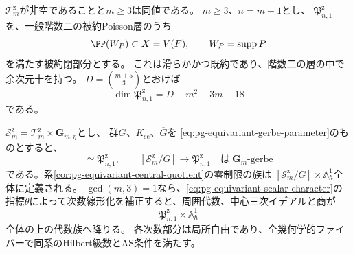 \begin{proposition}[support平面が超曲面に含まれる層の量子化]
\label{prop:pg-equivariant-zero-stratum}
$\mathcal T_m^{\mathrm z}$が非空であることと$m\ge3$は同値である。
$m\ge3$、$n=m+1$とし、
$\mathfrak P_{n,1}^{\mathrm z}$を、一般階数二の被約Poisson層のうち
\begin{equation}
 \PP(W_P)\subset X=V(F),\qquad W_P=\operatorname{supp}P
 \label{eq:pg-equivariant-contained-support-plane}
\end{equation}
を満たす被約閉部分とする。
これは滑らかかつ既約であり、階数二の層の中で余次元十を持つ。
$D=\binom{m+5}{3}$とおけば
\begin{equation}
 \dim\mathfrak P_{n,1}^{\mathrm z}=D-m^2-3m-18
 \label{eq:pg-equivariant-zero-stratum-dimension}
\end{equation}
である。

$\mathscr S_m^{\mathrm z}=\mathcal T_m^{\mathrm z}\times\mathbf G_{m,\eta}$とし、
群$G$、$K_{\mathrm{sc}}$、$\overline G$を
\eqref{eq:pg-equivariant-gerbe-parameter}のものとすると、
\begin{equation}
 [\mathscr S_m^{\mathrm z}/\overline G]\simeq\mathfrak P_{n,1}^{\mathrm z},
 \qquad
 [\mathscr S_m^{\mathrm z}/G]\longrightarrow\mathfrak P_{n,1}^{\mathrm z}
 \quad\text{は}\ \mathbf G_m\text{-gerbe}
 \label{eq:pg-equivariant-zero-gerbe}
\end{equation}
である。系\ref{cor:pg-equivariant-central-quotient}の零制限の族は
$[\mathscr S_m^{\mathrm z}/G]\times\mathbb A^1_\hbar$全体に定義される。
$\gcd(m,3)=1$なら、\eqref{eq:pg-equivariant-scalar-character}の
指標$\theta$によって次数線形化を補正すると、周囲代数、中心三次イデアルと商が
\begin{equation}
 \mathfrak P_{n,1}^{\mathrm z}\times\mathbb A^1_\hbar
 \label{eq:pg-equivariant-zero-descended-base}
\end{equation}
全体の上の代数族へ降りる。
各次数部分は局所自由であり、全幾何学的ファイバーで同系のHilbert級数とAS条件を満たす。
\end{proposition}
